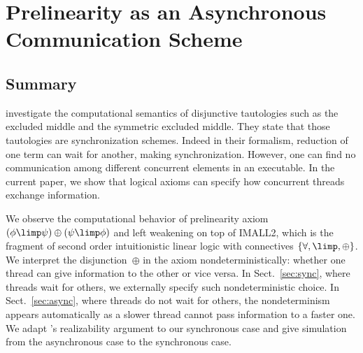 \chapter{Prelinearity as an Asynchronous Communication Scheme}




% 



\section{Summary}
\citet{danos-krivine} investigate
the computational semantics of disjunctive tautologies
such as the excluded middle and the symmetric excluded middle.
They state that those tautologies are synchronization schemes.
Indeed in their formalism, reduction of one term can wait
for another, making synchronization.
However,
one can find no communication among different
concurrent elements in an executable.
In the current paper, we show that logical axioms can specify how
concurrent threads exchange information.

We observe the computational behavior of prelinearity axiom
$(\phi\limp\psi)\oplus(\psi\limp\phi)$ and left weakening
on top of IMALL2, which is the fragment of second order
intuitionistic linear logic with connectives $\{\forall, \limp,
\oplus\}$.
We interpret the disjunction~$\oplus$ in the axiom
nondeterministically: whether
one thread can give information to the other or
vice versa.
In Sect.~\ref{sec:sync}, where threads wait for others,
we externally specify such nondeterministic choice.
In Sect.~\ref{sec:async}, where threads do not wait for others,
the nondeterminism appears automatically as a slower thread cannot pass
information to a faster one.
We adapt \citet{danos-krivine}'s realizability argument to our
synchronous case and give simulation from the
asynchronous case to the synchronous case.

